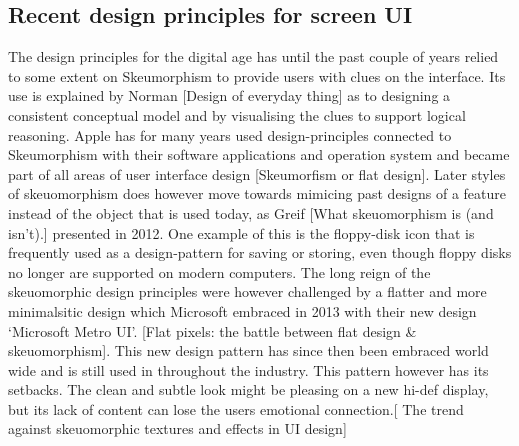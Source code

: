 \subsection{Recent design principles for screen UI}
The design principles for the digital age has until the past couple of years relied to some extent on Skeumorphism to provide users with clues on the interface. Its use is explained by Norman [Design of everyday thing] as to designing a consistent conceptual model and by visualising the clues to support logical reasoning. Apple has for many years used design-principles connected to Skeumorphism with their software applications and operation system and became part of all areas of user interface design [Skeumorfism or flat design]. Later styles of skeuomorphism does however move towards mimicing past designs of a feature instead of the object that is used today, as Greif [What skeuomorphism is (and isn’t).] presented in 2012. One example of this is the floppy-disk icon that is frequently used as a design-pattern for saving or storing, even though floppy disks no longer are supported on modern computers. The long reign of the skeuomorphic design principles were however challenged by a flatter and more minimalsitic design which Microsoft embraced in 2013 with their new design ‘Microsoft Metro UI’. [Flat pixels: the battle between flat design & skeuomorphism]. This new design pattern has since then been embraced world wide and is still used in throughout the industry. This pattern however has its setbacks. The clean and subtle look might be pleasing on a new hi-def display, but its lack of content can lose the users emotional connection.[ The trend against skeuomorphic textures and effects in UI design]
